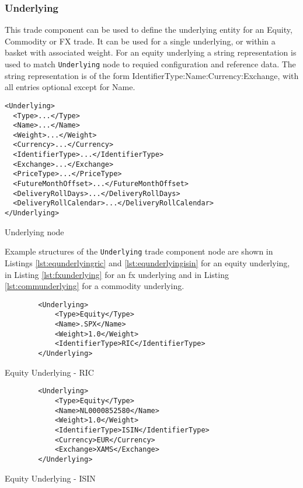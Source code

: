 \subsubsection{Underlying}
\label{ss:underlying}

This trade component can be used to define the underlying entity for an Equity, Commodity or FX trade. It can be used for a single underlying, or within a basket with associated weight.
For an equity underlying a string representation is used to match \lstinline!Underlying! node to requied configuration and reference data. The string representation is of the form {IdentifierType}:{Name}:{Currency}:{Exchange}, with all entries optional except for Name.


\begin{listing}[H]
\begin{verbatim}
<Underlying>
  <Type>...</Type>
  <Name>...</Name>
  <Weight>...</Weight>
  <Currency>...</Currency>
  <IdentifierType>...</IdentifierType>
  <Exchange>...</Exchange>
  <PriceType>...</PriceType>
  <FutureMonthOffset>...</FutureMonthOffset>
  <DeliveryRollDays>...</DeliveryRollDays>
  <DeliveryRollCalendar>...</DeliveryRollCalendar>
</Underlying>
\end{verbatim}
\caption{Underlying node}
\label{lst:underlying}
\end{listing}

Example structures of the \lstinline!Underlying! trade component node are shown in Listings \ref{lst:equnderlyingric} and \ref{lst:equnderlyingisin} for
an equity underlying, in Listing \ref{lst:fxunderlying} for an fx underlying and in Listing \ref{lst:communderlying} for
a commodity underlying.

\begin{listing}[H]
\begin{verbatim}
        <Underlying>
            <Type>Equity</Type>
            <Name>.SPX</Name>
            <Weight>1.0</Weight>
            <IdentifierType>RIC</IdentifierType>
        </Underlying>
\end{verbatim}
\caption{Equity Underlying - RIC}
\label{lst:equnderlyingric}
\end{listing}

\begin{listing}[H]
\begin{verbatim}
        <Underlying>
            <Type>Equity</Type>
            <Name>NL0000852580</Name>
            <Weight>1.0</Weight>
            <IdentifierType>ISIN</IdentifierType>
            <Currency>EUR</Currency>
            <Exchange>XAMS</Exchange>
        </Underlying>
\end{verbatim}
\caption{Equity Underlying - ISIN}
\label{lst:equnderlyingisin}
\end{listing}

